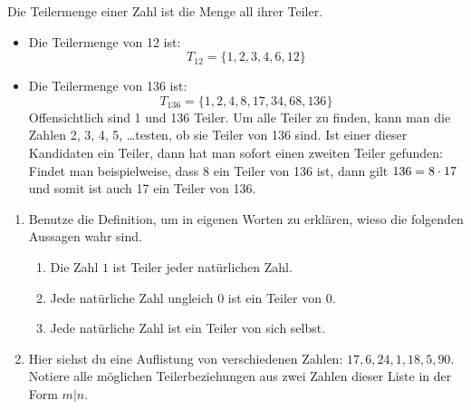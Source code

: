 \documentclass[11pt,oneside]{article}
\begin{document}
    \begin{beispiel}
    	Die Teilermenge einer Zahl ist die Menge all ihrer Teiler.
    	\begin{itemize}
    		\item Die Teilermenge von 12 ist: \[T_{12} = \{1, 2, 3, 4, 6, 12\}\]
    		\item Die Teilermenge von 136 ist: \[T_{136} = \{1, 2, 4, 8, 17, 34, 68, 136 \}\]
    		Offensichtlich sind 1 und 136 Teiler. Um alle Teiler zu finden, kann man die Zahlen 2, 3, 4, 5, \ldots testen, ob sie Teiler von 136 sind. Ist einer dieser Kandidaten ein Teiler, dann hat man sofort einen zweiten Teiler gefunden: Findet man beispielweise, dass 8 ein Teiler von 136 ist, dann gilt $136 = 8\cdot17$ und somit ist auch 17 ein Teiler von 136.
    	\end{itemize}
    \end{beispiel}
    \begin{aufgabe}
        \begin{enumerate}
            \item Benutze die Definition, um in eigenen Worten zu erklären, wieso die folgenden Aussagen wahr sind.
            \begin{enumerate}[label=\alph*)]
                \item Die Zahl $1$ ist Teiler jeder natürlichen Zahl.
                \item Jede natürliche Zahl ungleich $0$ ist ein Teiler von $0$.
                \item Jede natürliche Zahl ist ein Teiler von sich selbst.
            \end{enumerate}
            \item Hier siehst du eine Auflistung von verschiedenen Zahlen: $17,6,24,1,18,5,90$. Notiere alle möglichen Teilerbeziehungen aus zwei Zahlen dieser Liste in der Form $m|n$.
        \end{enumerate}
    \end{aufgabe}
\end{document}
